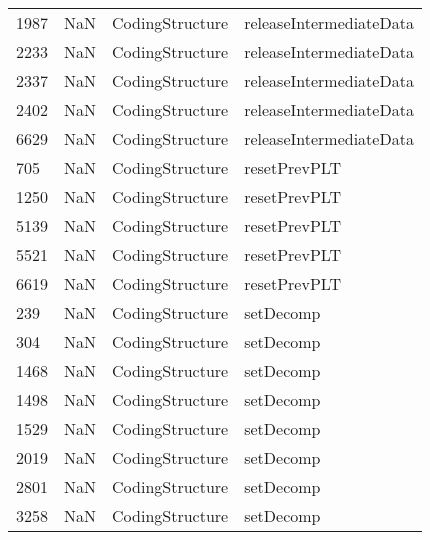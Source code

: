 \begin{tabular}{llll}
1987 &                   NaN &            CodingStructure &                   releaseIntermediateData \\
2233 &                   NaN &            CodingStructure &                   releaseIntermediateData \\
2337 &                   NaN &            CodingStructure &                   releaseIntermediateData \\
2402 &                   NaN &            CodingStructure &                   releaseIntermediateData \\
6629 &                   NaN &            CodingStructure &                   releaseIntermediateData \\
705  &                   NaN &            CodingStructure &                              resetPrevPLT \\
1250 &                   NaN &            CodingStructure &                              resetPrevPLT \\
5139 &                   NaN &            CodingStructure &                              resetPrevPLT \\
5521 &                   NaN &            CodingStructure &                              resetPrevPLT \\
6619 &                   NaN &            CodingStructure &                              resetPrevPLT \\
239  &                   NaN &            CodingStructure &                                 setDecomp \\
304  &                   NaN &            CodingStructure &                                 setDecomp \\
1468 &                   NaN &            CodingStructure &                                 setDecomp \\
1498 &                   NaN &            CodingStructure &                                 setDecomp \\
1529 &                   NaN &            CodingStructure &                                 setDecomp \\
2019 &                   NaN &            CodingStructure &                                 setDecomp \\
2801 &                   NaN &            CodingStructure &                                 setDecomp \\
3258 &                   NaN &            CodingStructure &                                 setDecomp \\

\end{tabular}
